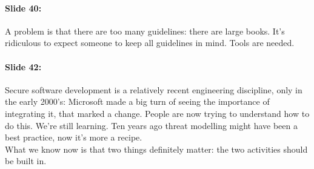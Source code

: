 \documentclass[10pt,a4paper]{report}
\begin{document}
\paragraph{Slide 40:} A problem is that there are too many guidelines: there are large books. It's ridiculous to expect someone to keep all guidelines in mind. Tools are needed. 

\paragraph{Slide 42:} Secure software development is a relatively recent engineering discipline, only in the early 2000's: Microsoft made a big turn of seeing the importance of integrating it, that marked a change. People are now trying to understand how to do this. We're still learning. Ten years ago threat modelling might have been a best practice, now it's more a recipe. \\
What we know now is that two things definitely matter: the two activities should be built in. 
\end{document}
